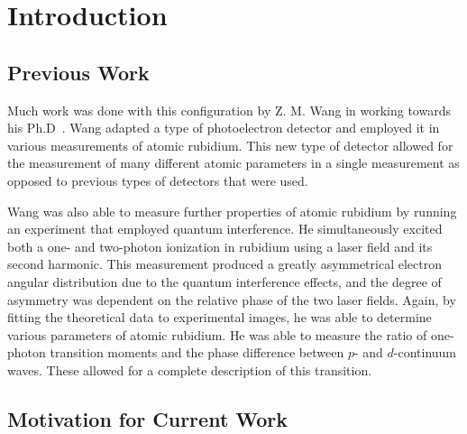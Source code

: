 

\chapter{Introduction}



\section{Previous Work}




Much work was done with this configuration by Z. M. Wang in
working towards his Ph.D~\cite{Wang0}.  Wang adapted a type of
photoelectron detector and employed it in various measurements of
atomic rubidium.  This new type of detector allowed for the
measurement of many different atomic parameters in a single
measurement as opposed to previous types of detectors that were
used.


Wang was also able to measure further properties of atomic
rubidium by running an experiment that employed quantum
interference.  He simultaneously excited both a one- and
two-photon ionization in rubidium using a laser field and its
second harmonic.  This measurement produced a greatly asymmetrical
electron angular distribution due to the quantum interference
effects, and the degree of asymmetry was dependent on the relative
phase of the two laser fields. Again, by fitting the theoretical
data to experimental images, he was able to determine various
parameters of atomic rubidium.  He was able to measure the ratio
of one-photon transition moments and the phase difference between
$p$- and $d$-continuum waves.  These allowed for a complete
description of this transition.

\section{Motivation for Current Work}

